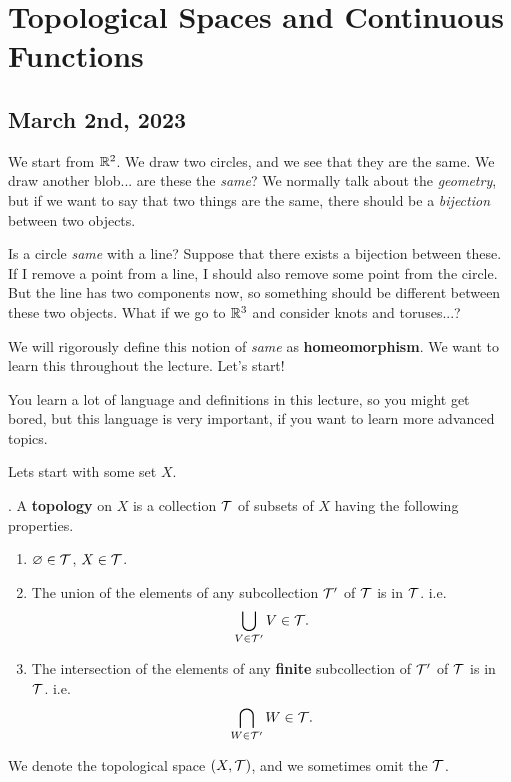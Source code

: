 \setcounter{chapter}{1}
\chapter{Topological Spaces and Continuous Functions}

\section*{March 2nd, 2023}

We start from \(\mathbb{R}^2\). We draw two circles, and we see that they are the same. We draw another blob... are these the \textit{same}? We normally talk about the \textit{geometry}, but if we want to say that two things are the same, there should be a \textit{bijection} between two objects.

Is a circle \textit{same} with a line? Suppose that there exists a bijection between these. If I remove a point from a line, I should also remove some point from the circle. But the line has two components now, so something should be different between these two objects. What if we go to \(\mathbb{R}^3\) and consider knots and toruses...?

We will rigorously define this notion of \textit{same} as \textbf{homeomorphism}. We want to learn this throughout the lecture. Let's start!

You learn a lot of language and definitions in this lecture, so you might get bored, but this language is very important, if you want to learn more advanced topics.

Lets start with some set \(X\).


.  A \textbf{topology} on \(X\) is a collection \(\mathcal{T}\) of subsets of \(X\) having the following properties.
\begin{enumerate}
    \item \(\varnothing \in \mathcal{T}\), \(X \in \mathcal{T}\).
    \item The union of the elements of any subcollection \(\mathcal{T'}\) of \(\mathcal{T}\) is in \(\mathcal{T}\). i.e.
          \[
              \bigcup_{V \in \mathcal{T'}} V \in \mathcal{T}.
          \]
    \item The intersection of the elements of any \textbf{finite} subcollection of \(\mathcal{T}'\) of \(\mathcal{T}\) is in \(\mathcal{T}\). i.e.
          \[
              \bigcap_{W \in \mathcal{T'}} W \in \mathcal{T}.
          \]
\end{enumerate}
We denote the topological space \((X, \mathcal{T})\), and we sometimes omit the \(\mathcal{T}\).

